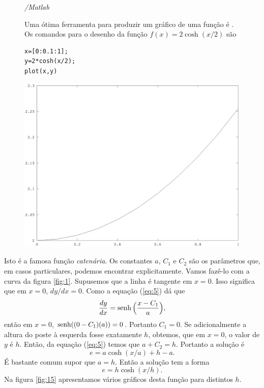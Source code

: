 \begin{figure}
\begin{mybox}
  \begin{center}
    \emph{\textcolor{bluesol}{\Octave/Matlab}}
  \end{center}


  Uma ótima ferramenta para produzir um gráfico de uma função é
  \Octave. Os comandos para o desenho da função
  $f(x)=2\cosh(x/2)$ são
  \begin{octavebox}
    \begin{verbatim}
x=[0:0.1:1];
y=2*cosh(x/2);
plot(x,y)
\end{verbatim}
  \end{octavebox}
{\noindent\includegraphics[width=\columnwidth]{g1}}
\end{mybox}
\vspace{10px}
\end{figure}

Isto é a famosa função \emph{catenária}. Os constantes $a$, $C_1$
e $C_2$ são os parâmetros que, em casos particulares, podemos encontrar
explicitamente. Vamos fazê-lo com a curva da figura
\ref{fig:1}. Supusemos que a linha é tangente em
$x=0$. Isso significa que em $x=0$, $dy/dx=0$. Como a equação
(\ref{eq:5}) dá que
\begin{equation}
  \label{eq:1}
  \frac{dy}{dx}=\operatorname{senh}\Big(\frac{x-C_1}{a}\Big),
\end{equation}
então em $x=0$, $\operatorname{senh}((0-C_1)(a))=0$. Portanto $C_1=0$. Se
adicionalmente a altura do poste à esquerda fosse exatamente
$h$, obtemos, que em $x=0$, o valor de $y$ é $h$. Então, da
equação (\ref{eq:5}) temos que $a+C_2=h$. Portanto a solução
é
\begin{equation}
  \label{eq:2}
  e = a \cosh(x/a) + h-a.
\end{equation}
É bastante comum supor que $a=h$. Então a solução tem a
forma
\begin{equation}
  \label{eq:3}
  e = h \cosh(x/h).
\end{equation}
Na figura \ref{fig:15} apresentamos vários gráficos desta função para
distintos $h$.


